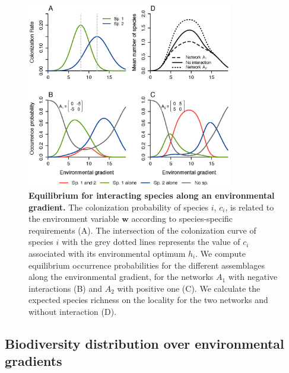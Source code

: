 \begin{figure}[h!]
\centering
\includegraphics[width=0.8\textwidth]{./chapitre1/fig3.eps}
\caption{\textbf{Equilibrium for interacting species along an environmental gradient.} The colonization probability of species $i$, $c_i$, is related to the environment variable $\mathbf{w}$ according to species-specific requirements (A). The intersection of the colonization curve of species $i$ with the grey dotted lines represents the value of $c_i$ associated with its environmental optimum $h_i$. We compute equilibrium occurrence probabilities for the different assemblages along the environmental gradient, for the networks $A_1$ with negative interactions (B) and $A_2$ with positive one (C). We calculate the expected species richness on the locality for the two networks and without interaction (D).
}
\label{chap1fig3}
\end{figure}



\subsection{Biodiversity distribution over environmental gradients}

